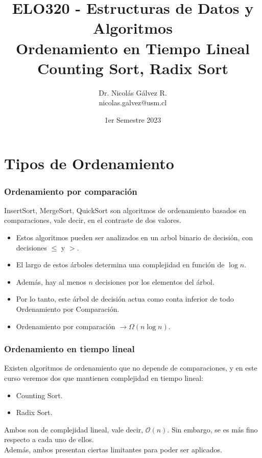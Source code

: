 \documentclass{beamer}
\title{ELO320 - Estructuras de Datos y Algoritmos\\Ordenamiento en Tiempo Lineal\\\small{Counting Sort, Radix Sort}}
\author{Dr. Nicolás Gálvez R.\\{\small nicolas.galvez@usm.cl}}
\institute{Ing. Civil Telemática - Departamento de Electrónica}
\date{1er Semestre 2023}
\begin{document}
\frame{\titlepage}

%
%

\section{Tipos de Ordenamiento}
\begin{frame}[fragile]
 \frametitle{Ordenamiento por comparación}
\small InsertSort, MergeSort, QuickSort son algoritmos de ordenamiento basados en comparaciones, vale decir, en el contraste de dos valores.

\begin{itemize}
\item Estos algoritmos pueden ser analizados en un arbol binario de decisión, con decisiones $\leq$ y $>$. 
\item El largo de estos árboles determina una complejidad en función de $\log n$. 
\item Además, hay al menos $n$ decisiones por los elementos del árbol. 
\item Por lo tanto, este árbol de decisión actua como conta inferior de todo Ordenamiento por Comparación.
\item Ordenamiento por comparación $\rightarrow \Omega(n \log n)$. 
\end{itemize}

\end{frame}

\begin{frame}[fragile]
 \frametitle{Ordenamiento en tiempo lineal}
\small Existen algoritmos de ordenamiento que no depende de comparaciones, y en este curso veremos dos que mantienen complejidad en tiempo lineal:
\begin{itemize}
\item Counting Sort.
\item Radix Sort.
\end{itemize}

Ambos son de complejidad lineal, vale decir, $\mathcal{O}(n)$. Sin embargo, se es más fino respecto a cada uno de ellos.\\

Además, ambos presentan ciertas limitantes para poder ser aplicados.
\end{frame}
\end{document}
